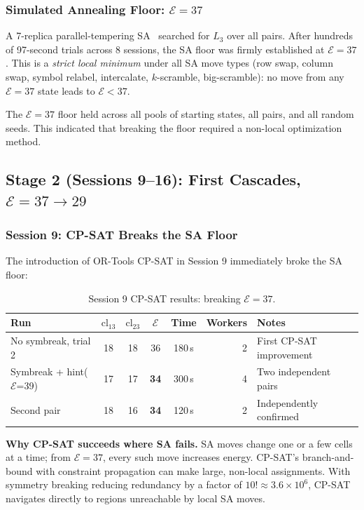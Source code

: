 \documentclass[11pt,a4paper]{article}
\theoremstyle{remark}
\newcommand{\cl}{\mathrm{cl}}
\newcommand{\E}{\mathcal{E}}
\begin{document}
\subsubsection{Simulated Annealing Floor: $\E = 37$}

A 7-replica parallel-tempering SA~\cite{geyer1991} searched for $L_3$ over all pairs.
After hundreds of 97-second trials across 8 sessions, the SA floor was firmly established
at $\E = 37$. This is a \emph{strict local minimum} under all SA move types (row swap,
column swap, symbol relabel, intercalate, $k$-scramble, big-scramble): no move from any
$\E=37$ state leads to $\E < 37$.

The $\E = 37$ floor held across all pools of starting states, all pairs, and all random
seeds. This indicated that breaking the floor required a non-local optimization method.

\subsection{Stage 2 (Sessions 9--16): First Cascades, $\E = 37 \to 29$}

\subsubsection{Session 9: CP-SAT Breaks the SA Floor}

The introduction of OR-Tools CP-SAT in Session 9 immediately broke the SA floor:

\begin{table}[h]
\centering
\caption{Session 9 CP-SAT results: breaking $\E=37$.}\label{tab:sess9}
\begin{tabular}{lccccrl}
\toprule
Run & $\cl_{13}$ & $\cl_{23}$ & $\E$ & Time & Workers & Notes\\
\midrule
No symbreak, trial 2 & 18 & 18 & 36 & 180\,s & 2 & First CP-SAT improvement\\
Symbreak + hint($\E$=39) & 17 & 17 & \textbf{34} & 300\,s & 4 & Two independent pairs\\
Second pair & 18 & 16 & \textbf{34} & 120\,s & 2 & Independently confirmed\\
\bottomrule
\end{tabular}
\end{table}

\textbf{Why CP-SAT succeeds where SA fails.} SA moves change one or a few cells at a
time; from $\E=37$, every such move increases energy. CP-SAT's branch-and-bound with
constraint propagation can make large, non-local assignments. With symmetry breaking
reducing redundancy by a factor of $10! \approx 3.6 \times 10^6$, CP-SAT navigates
directly to regions unreachable by local SA moves.
\end{document}
